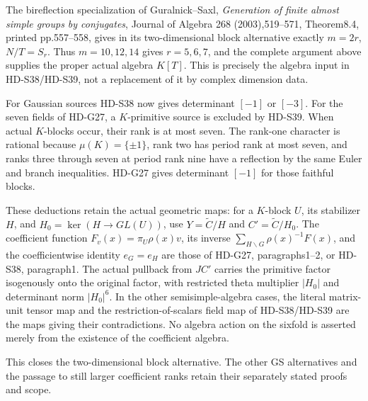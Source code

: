 The bireflection specialization of Guralnick--Saxl,
\emph{Generation of finite almost simple groups by conjugates},
Journal of Algebra 268 (2003),519--571,
Theorem8.4, printed pp.557--558, gives in its two-dimensional
block alternative exactly \(m=2r\), \(N/T=S_r\).
Thus \(m=10,12,14\) gives \(r=5,6,7\), and the complete
argument above supplies the proper actual algebra \(K[T]\).
This is precisely the algebra input in HD-S38/HD-S39, not a
replacement of it by complex dimension data.

For Gaussian sources HD-S38 now gives determinant \([-1]\)
or \([-3]\). For the seven fields of HD-G27, a
\(K\)-primitive source is excluded by HD-S39. When actual
\(K\)-blocks occur, their rank is at most seven. The rank-one
character is rational because \(\mu(K)=\{\pm1\}\), rank
two has period rank at most seven, and ranks three through
seven at period rank nine have a reflection by the same
Euler and branch inequalities. HD-G27 gives determinant
\([-1]\) for those faithful blocks.

These deductions retain the actual geometric maps: for a
\(K\)-block \(U\), its stabilizer \(H\), and
\(H_0=\ker(H\to GL(U))\), use
\(Y=\widetilde C/H\) and \(C'=\widetilde C/H_0\).
The coefficient function \(F_v(x)=\pi_U\rho(x)v\), its
inverse \(\sum_{H\backslash G}\rho(x)^{-1}F(x)\), and
the coefficientwise identity \(e_G=e_H\) are those of
HD-G27, paragraphs1--2, or HD-S38, paragraph1.
The actual pullback from \(JC'\) carries the primitive
factor isogenously onto the original factor, with restricted
theta multiplier \(|H_0|\) and determinant norm
\(|H_0|^6\). In the other semisimple-algebra cases, the
literal matrix-unit tensor map and the restriction-of-scalars
field map of HD-S38/HD-S39 are the maps giving their
contradictions. No algebra action on the sixfold is asserted
merely from the existence of the coefficient algebra.

This closes the two-dimensional block alternative. The other
GS alternatives and the passage to still larger coefficient
ranks retain their separately stated proofs and scope.
